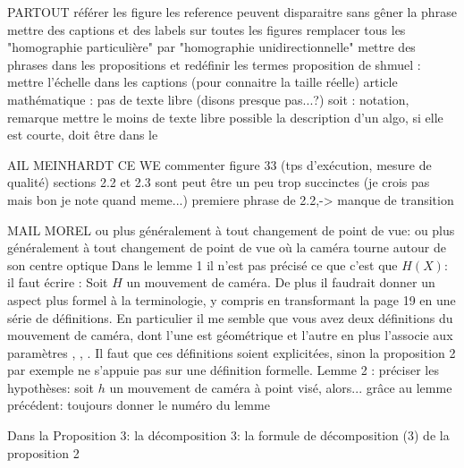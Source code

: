 PARTOUT
	référer les figure
	les reference peuvent disparaitre sans gêner la phrase
	mettre des captions et des labels sur toutes les figures
	remplacer tous les "homographie particulière" par "homographie unidirectionnelle"
	mettre des phrases dans les propositions et redéfinir les termes
	proposition de shmuel : mettre l'échelle dans les captions (pour connaitre la taille réelle)
	article mathématique : pas de texte libre (disons presque pas...?)
		soit : notation, remarque
	mettre le moins de texte libre possible
	la description d'un algo, si elle est courte, doit être dans le \caption


MAIL MEINHARDT CE WE
	commenter figure 33 (tps d'exécution, mesure de qualité)
	sections 2.2 et 2.3 sont peut être un peu trop succinctes (je crois pas mais bon je note quand meme...) 
	premiere phrase de 2.2,-> manque de transition

MAIL MOREL
	ou plus généralement à tout changement de point de vue: ou plus généralement à tout changement de point de vue où la caméra tourne autour de son centre optique
	Dans le lemme 1 il n'est pas précisé ce que c'est que $H(X)$: il faut écrire : Soit $H$ un mouvement de caméra.
	De plus il faudrait donner un aspect plus formel à la terminologie, y compris en transformant la page 19 en une série de définitions. En particulier il me semble que vous avez deux définitions du mouvement de caméra, dont l'une est géométrique et l'autre en plus l'associe aux paramètres \theta, \phi, \psi. Il faut que ces définitions soient explicitées, sinon la proposition 2 par exemple ne s'appuie pas sur une définition formelle.
	Lemme 2 : préciser les hypothèses: soit $h$ un mouvement  de caméra à point visé, alors...
	grâce au lemme précédent: toujours donner le numéro du lemme
	
	Dans la Proposition 3: la décomposition 3: la formule de décomposition (3) de la proposition 2
